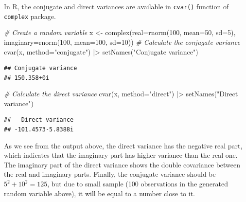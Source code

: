 \documentclass[
]{book}
\newenvironment{Shaded}{\begin{snugshade}}{\end{snugshade}}
\newcommand{\AttributeTok}[1]{\textcolor[rgb]{0.77,0.63,0.00}{#1}}
\newcommand{\CommentTok}[1]{\textcolor[rgb]{0.56,0.35,0.01}{\textit{#1}}}
\newcommand{\DecValTok}[1]{\textcolor[rgb]{0.00,0.00,0.81}{#1}}
\newcommand{\FunctionTok}[1]{\textcolor[rgb]{0.00,0.00,0.00}{#1}}
\newcommand{\NormalTok}[1]{#1}
\newcommand{\OtherTok}[1]{\textcolor[rgb]{0.56,0.35,0.01}{#1}}
\newcommand{\SpecialCharTok}[1]{\textcolor[rgb]{0.00,0.00,0.00}{#1}}
\newcommand{\StringTok}[1]{\textcolor[rgb]{0.31,0.60,0.02}{#1}}
\begin{document}
In R, the conjugate and direct variances are available in \texttt{cvar()} function of \texttt{complex} package.

\begin{Shaded}
\begin{Highlighting}[]
\CommentTok{\# Create a random variable}
\NormalTok{x }\OtherTok{\textless{}{-}} \FunctionTok{complex}\NormalTok{(}\AttributeTok{real=}\FunctionTok{rnorm}\NormalTok{(}\DecValTok{100}\NormalTok{, }\AttributeTok{mean=}\DecValTok{50}\NormalTok{, }\AttributeTok{sd=}\DecValTok{5}\NormalTok{),}
             \AttributeTok{imaginary=}\FunctionTok{rnorm}\NormalTok{(}\DecValTok{100}\NormalTok{, }\AttributeTok{mean=}\DecValTok{100}\NormalTok{, }\AttributeTok{sd=}\DecValTok{10}\NormalTok{))}
\CommentTok{\# Calculate the conjugate variance}
\FunctionTok{cvar}\NormalTok{(x, }\AttributeTok{method=}\StringTok{"conjugate"}\NormalTok{) }\SpecialCharTok{|\textgreater{}}
    \FunctionTok{setNames}\NormalTok{(}\StringTok{"Conjugate variance"}\NormalTok{)}
\end{Highlighting}
\end{Shaded}

\begin{verbatim}
## Conjugate variance 
## 150.358+0i
\end{verbatim}

\begin{Shaded}
\begin{Highlighting}[]
\CommentTok{\# Calculate the direct variance}
\FunctionTok{cvar}\NormalTok{(x, }\AttributeTok{method=}\StringTok{"direct"}\NormalTok{) }\SpecialCharTok{|\textgreater{}}
    \FunctionTok{setNames}\NormalTok{(}\StringTok{"Direct variance"}\NormalTok{)}
\end{Highlighting}
\end{Shaded}

\begin{verbatim}
##   Direct variance 
## -101.4573-5.8388i
\end{verbatim}

As we see from the output above, the direct variance has the negative real part, which indicates that the imaginary part has higher variance than the real one. The imaginary part of the direct variance shows the double covariance between the real and imaginary parts. Finally, the conjugate variance should be \(5^2 + 10^2 = 125\), but due to small sample (100 observations in the generated random variable above), it will be equal to a number close to it.
\end{document}
